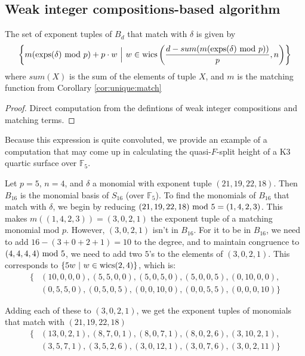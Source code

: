 \subsection{Weak integer compositions-based algorithm}

\begin{lem}
    \label{lem:generate:matching}
    The set of exponent tuples of \(B_{d}\) that match with $\delta$ is given by 
    \[
        \left\{ m(\operatorname{exps}(\delta) \text{ mod } p) + p\cdot w ~\Big|~ w \in \operatorname{wics} 
        \left(\frac{d - sum(m(\operatorname{exps}(\delta) \text{ mod } p))}{p}, n \right) \right\}
    \]
    where $sum(X)$ is the sum of the elements of tuple $X$, and $m$ is the matching function from Corollary \ref{cor:unique:match}
\end{lem}

\begin{proof}
    Direct computation from the defintions of weak integer compositions and matching terms.
\end{proof}


Because this expression is quite convoluted, we 
provide an example of a computation 
that may come up in calculating the quasi-\(F\)-split 
height of a K3 quartic surface over $\mathbb{F}_5$.

\begin{ex}
    Let $p = 5$, \(n = 4\), and $\delta$ a monomial 
    with exponent tuple $(21, 19, 22, 18)$. 
    Then $B_{16}$ is the monomial basis of 
    \(S_{16}\) (over $\mathbb{F}_5$). 
    To find the monomials of $B_{16}$ that match with 
    $\delta$, we begin by reducing $(21, 19, 22, 18) \text{ mod } 5 = (1, 4, 2, 3)$.
    This makes $m((1, 4, 2, 3)) = (3, 0, 2, 1)$ the 
    exponent tuple of a matching monomial mod \(p\).
    However, \((3, 0, 2, 1)\) isn't in $B_{16}$. 
    For it to be in $B_{16}$, we need to add $16 - (3 + 0 + 2 + 1) = 10$ 
    to the degree, and to maintain congruence to 
    $(4, 4, 4, 4) \text{ mod } 5$, we need to add two $5$'s 
    to the elements of $(3, 0, 2, 1)$. This corresponds 
    to $\{5w ~|~ w \in \operatorname{wics}(2, 4)\}$, which is:
    \begin{align*}
        \{&(10, 0, 0, 0), (5, 5, 0, 0), (5, 0, 5, 0), (5, 0, 0, 5), (0, 10, 0, 0), \\
        &(0, 5, 5, 0), (0, 5, 0, 5), (0, 0, 10, 0), (0, 0, 5, 5), (0, 0, 0, 10)\}
    \end{align*}
        
    \noindent Adding each of these to $(3, 0, 2, 1)$, we get the 
    exponent tuples of monomials that match with $(21, 19, 22, 18)$
    \begin{align*}
        \{&(13, 0, 2, 1), (8, 7, 0, 1), (8, 0, 7, 1), (8, 0, 2, 6), (3, 10, 2, 1), \\
        &(3, 5, 7, 1), (3, 5, 2, 6), (3, 0, 12, 1), (3, 0, 7, 6), (3, 0, 2, 11)\}
    \end{align*}    
\end{ex}

